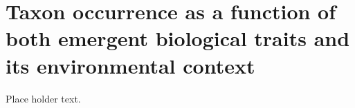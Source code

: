 \chapter{Taxon occurrence as a function of both emergent biological traits and its environmental context} \label{ch:coping}

Place holder text.
